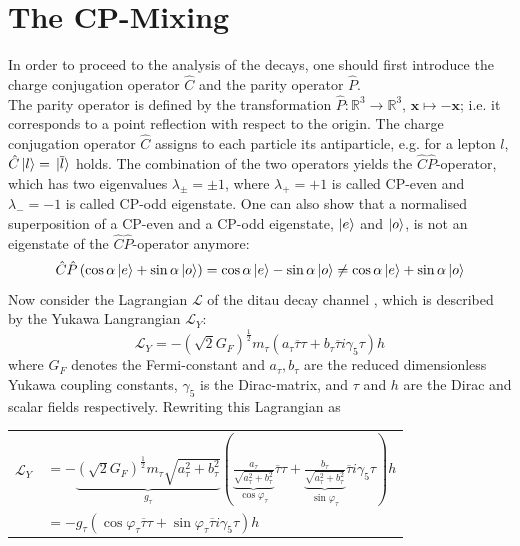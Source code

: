 \section{The CP-Mixing}
In order to proceed to the analysis of the decays, one should first introduce the charge conjugation operator $\hat{C}$ and the parity operator $\hat{P}$. \\
The parity operator is defined by the transformation $\hat{P}: \mathbb{R}^3 \rightarrow \mathbb{R}^3, \, \boldsymbol{x} \mapsto -\boldsymbol{x}$; i.e. it corresponds to a point reflection with respect to the origin. The charge conjugation operator $\hat{C}$ assigns to each particle its antiparticle, e.g. for a lepton $l$, $\hat{C}\ket{l} = \ket*{\overline{l}}$ holds. The combination of the two operators yields the $\hat{C}\hat{P}$-operator, which has two eigenvalues $\lambda_\pm=\pm 1$, where $\lambda_+=+1$ is called CP-even and $\lambda_-=-1$ is called CP-odd eigenstate. One can also show that a normalised superposition of a CP-even and a CP-odd eigenstate, $\ket{e}$ and $\ket{o}$, is not an eigenstate of the $\hat{C}\hat{P}$-operator anymore:
\begin{equation}
	\hat{C}\hat{P} \left(\cos\alpha\ket{e}+\sin\alpha\ket{o}\right) = \cos\alpha\ket{e}-\sin\alpha\ket{o} \neq \cos\alpha\ket{e}+\sin\alpha\ket{o}
\end{equation}
Now consider the Lagrangian $\mathcal{L}$ of the ditau decay channel \parencite{Berge_DY_bckg}, which is described by the Yukawa Langrangian $\mathcal{L}_Y$:
\begin{equation}
	\mathcal{L}_Y = -\left(\sqrt{2} G_F\right)^\frac{1}{2} m_\tau (a_\tau \overline{\tau}\tau+b_\tau \overline{\tau}i\gamma_5\tau)h
\end{equation}
where $G_F$ denotes the Fermi-constant and $a_\tau, b_\tau$ are the reduced dimensionless Yukawa coupling constants, $\gamma_5$ is the Dirac-matrix, and $\tau$ and $h$ are the Dirac and scalar fields respectively. Rewriting this Lagrangian as
\begin{center}
	\begin{tabular}{ll}
		$\mathcal{L}_Y $ & $= -\underbrace{\left(\sqrt{2} G_F\right)^\frac{1}{2} m_\tau\sqrt{a_\tau^2+b_\tau^2}}_\text{$g_\tau$} \left(\underbrace{\frac{a_\tau}{\sqrt{a_\tau^2+b_\tau^2}}}_\text{$\cos\varphi_\tau$} \overline{\tau}\tau+\underbrace{\frac{b_\tau}{\sqrt{a_\tau^2+b_\tau^2}}}_\text{$\sin\varphi_\tau$} \overline{\tau}i\gamma_5\tau\right)h$\\
		 & $= - g_\tau \left(\cos\varphi_\tau\overline{\tau}\tau+\sin\varphi_\tau\overline{\tau}i\gamma_5\tau\right)h$
	\end{tabular}
\end{center}
